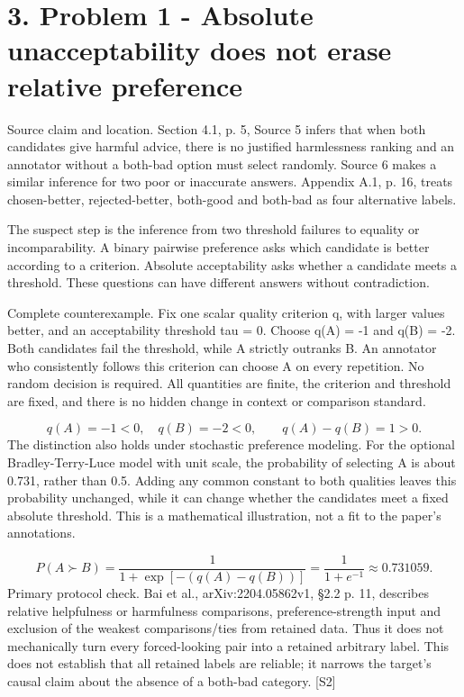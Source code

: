\documentclass[10pt]{article}
\begin{document}
\section*{3. Problem 1 - Absolute unacceptability does not erase relative preference}
Source claim and location. Section 4.1, p. 5, Source 5 infers that when both candidates give harmful advice, there is no justified harmlessness ranking and an annotator without a both-bad option must select randomly. Source 6 makes a similar inference for two poor or inaccurate answers. Appendix A.1, p. 16, treats chosen-better, rejected-better, both-good and both-bad as four alternative labels.\par
The suspect step is the inference from two threshold failures to equality or incomparability. A binary pairwise preference asks which candidate is better according to a criterion. Absolute acceptability asks whether a candidate meets a threshold. These questions can have different answers without contradiction.\par
Complete counterexample. Fix one scalar quality criterion q, with larger values better, and an acceptability threshold tau = 0. Choose q(A) = -1 and q(B) = -2. Both candidates fail the threshold, while A strictly outranks B. An annotator who consistently follows this criterion can choose A on every repetition. No random decision is required. All quantities are finite, the criterion and threshold are fixed, and there is no hidden change in context or comparison standard.\par
\[q(A)=-1<0,\quad q(B)=-2<0,\qquad q(A)-q(B)=1>0.\] The distinction also holds under stochastic preference modeling. For the optional Bradley-Terry-Luce model with unit scale, the probability of selecting A is about 0.731, rather than 0.5. Adding any common constant to both qualities leaves this probability unchanged, while it can change whether the candidates meet a fixed absolute threshold. This is a mathematical illustration, not a fit to the paper’s annotations.\par
\[P(A\succ B)=\frac{1}{1+\exp[-(q(A)-q(B))]}=\frac{1}{1+e^{-1}}\approx0.731059.\] Primary protocol check. Bai et al., arXiv:2204.05862v1, §2.2 p. 11, describes relative helpfulness or harmfulness comparisons, preference-strength input and exclusion of the weakest comparisons/ties from retained data. Thus it does not mechanically turn every forced-looking pair into a retained arbitrary label. This does not establish that all retained labels are reliable; it narrows the target’s causal claim about the absence of a both-bad category. [S2]\par
\end{document}
